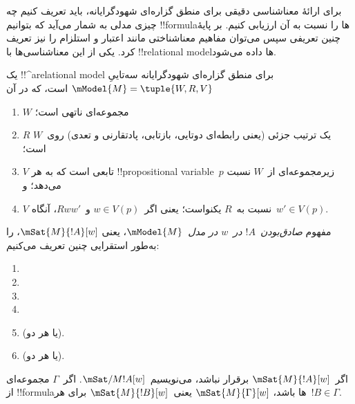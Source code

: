 \documentclass[../../../include/open-logic-section]{subfiles}
\begin{document}


برای ارائهٔ معناشناسی دقیقی برای منطق گزاره‌ای شهودگرایانه، باید تعریف
کنیم چه چیزی مدلی به شمار می‌آید که بتوانیم !!{formula}ها را نسبت به آن
ارزیابی کنیم. بر پایهٔ چنین تعریفی سپس می‌توان مفاهیم معناشناختی مانند
اعتبار و استلزام را نیز تعریف کرد. یکی از این معناشناسی‌ها با
!!{relational model}ها داده می‌شود.

\begin{defn}
  یک !!^a{relational model} برای منطق گزاره‌ای شهودگرایانه سه‌تاییِ
  $\mModel{M} = \tuple{W, R, V}$ است، که در آن
  \begin{enumerate}
  \item $W$ مجموعه‌ای ناتهی است؛
  \item $R$ یک ترتیب جزئی (یعنی رابطه‌ای دوتایی، بازتابی، پادتقارنی و
    تعدی) روی~$W$ است؛
  \item $V$ تابعی است که به هر !!{propositional
    variable}~$p$ زیرمجموعه‌ای از~$W$ نسبت می‌دهد؛ و
  \item $V$ نسبت به~$R$ یکنواست؛ یعنی اگر~$w \in V(p)$ و~$Rww'$،
    آنگاه~$w' \in V(p)$.
  \end{enumerate}
\end{defn}

\begin{defn}
  مفهوم \emph{صادق‌بودن~$!A$ در~$w$ در مدل~$\mModel{M}$}، یعنی
  $\mSat{M}{!A}[w]$، را به‌طور استقرایی چنین تعریف می‌کنیم:
  \begin{enumerate}
  \item {}
  \item {}
  \item {}
  \item {}
  \item {} (یا هر دو).
  \item {} (یا هر دو).
  \end{enumerate}
  اگر~$\mSat{M}{!A}[w]$ برقرار نباشد، می‌نویسیم~$\mSat/{M}{!A}[w]$.
  اگر~$\Gamma$ مجموعه‌ای از !!{formula}ها باشد، $\mSat{M}{\Gamma}[w]$
  یعنی~$\mSat{M}{!B}[w]$ برای هر~$!B \in \Gamma$.
\end{defn}
\end{document}
